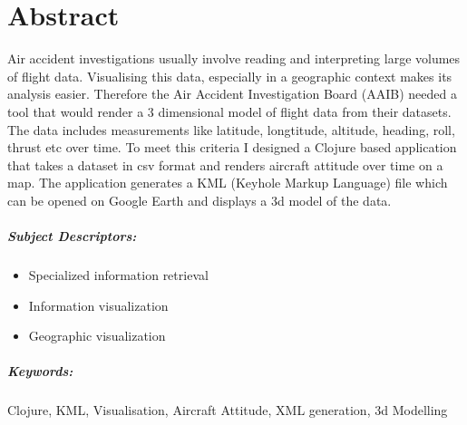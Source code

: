 

\begingroup
\let\clearpage\relax
\let\cleardoublepage\relax
\let\cleardoublepage\relax

\chapter*{Abstract} %

Air accident investigations usually involve reading and interpreting large volumes of flight data.
Visualising this data, especially in a geographic context makes its analysis easier. Therefore the Air
Accident Investigation Board (AAIB) needed a tool that would render a 3 dimensional model of flight data
from their datasets. The data includes measurements like latitude, longtitude, altitude, heading, roll, thrust etc over time.
To meet this criteria I designed a Clojure based application that takes a dataset in csv format and renders
aircraft attitude over time on a map. The application generates a KML (Keyhole Markup Language) file which
 can be opened on Google Earth and displays a 3d model of the data.\\

\paragraph{Subject Descriptors:}
\begin{itemize}
\item Specialized information retrieval
\item Information visualization
\item Geographic visualization
\end{itemize}

\paragraph{Keywords:} Clojure, KML, Visualisation, Aircraft Attitude, XML generation, 3d Modelling
\endgroup

\vfill
